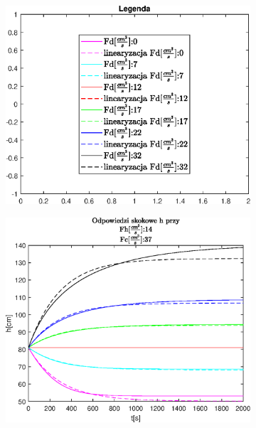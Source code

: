 \begin{figure}[h!]
   \centering
   \begin{subfigure}[b]{0.6\textwidth}
      \includegraphics[width=1\linewidth]{img/step-responses-fd/legendFigureFd.eps}
      \caption{}
      \label{fig:fig:stepResponsesFhFd1}
   \end{subfigure}
       
   \begin{subfigure}[b]{0.6\textwidth}
      \includegraphics[width=1\linewidth]{img/step-responses-fd/stepResponseHFhFd.eps}
      \caption{}
      \label{fig:fig:stepResponsesFhFd2}
   \end{subfigure}
       

\end{figure}
